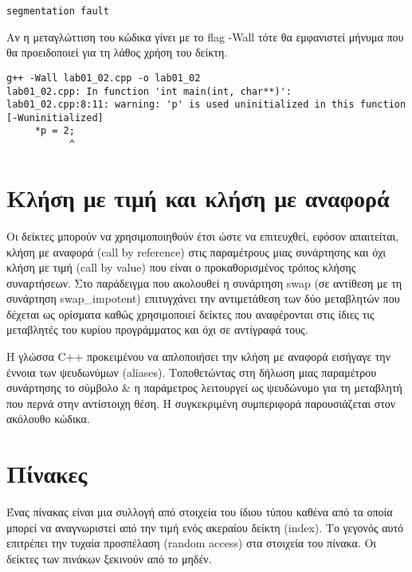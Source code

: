 \begin{lstlisting}[style=DOS]
segmentation fault
\end{lstlisting}

Αν η μεταγλώττιση του κώδικα γίνει με το flag -Wall τότε θα εμφανιστεί μήνυμα που θα προειδοποιεί για τη λάθος χρήση του δείκτη.

\begin{lstlisting}[style=DOS]
g++ -Wall lab01_02.cpp -o lab01_02
lab01_02.cpp: In function 'int main(int, char**)':
lab01_02.cpp:8:11: warning: 'p' is used uninitialized in this function [-Wuninitialized]
     *p = 2;
           ^
\end{lstlisting}

\section{Κλήση με τιμή και κλήση με αναφορά}
Οι δείκτες μπορούν να χρησιμοποιηθούν έτσι ώστε να επιτευχθεί, εφόσον απαιτείται, κλήση με αναφορά (call by reference) στις παραμέτρους μιας συνάρτησης και όχι κλήση με τιμή (call by value) που είναι ο προκαθορισμένος τρόπος κλήσης συναρτήσεων. Στο παράδειγμα που ακολουθεί η συνάρτηση swap (σε αντίθεση με τη συνάρτηση swap\_impotent) επιτυγχάνει την αντιμετάθεση των δύο μεταβλητών που δέχεται ως ορίσματα καθώς χρησιμοποιεί δείκτες που αναφέρονται στις ίδιες τις μεταβλητές του κυρίου προγράμματος και όχι σε αντίγραφά τους. 






Η γλώσσα C++ προκειμένου να απλοποιήσει την κλήση με αναφορά εισήγαγε την έννοια των ψευδωνύμων (aliases). Τοποθετώντας στη δήλωση μιας παραμέτρου συνάρτησης το σύμβολο \& η παράμετρος λειτουργεί ως ψευδώνυμο για τη μεταβλητή που περνά στην αντίστοιχη θέση. Η συγκεκριμένη συμπεριφορά παρουσιάζεται στον ακόλουθο κώδικα.






\section{Πίνακες}
Ένας  πίνακας είναι μια συλλογή από στοιχεία του ίδιου τύπου καθένα από τα οποία μπορεί να αναγνωριστεί από την τιμή ενός ακεραίου δείκτη (index).  Το γεγονός αυτό επιτρέπει την τυχαία προσπέλαση (random access) στα στοιχεία του πίνακα. Οι δείκτες των πινάκων ξεκινούν από το μηδέν. 

